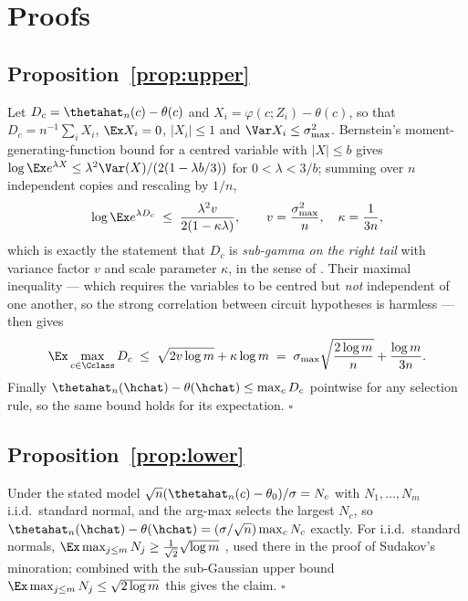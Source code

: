 \section{Proofs}
\label{app:proofs}

\subsection{Proposition~\ref{prop:upper}}

Let $D_c=\thetahat_n(c)-\theta(c)$ and $X_i = \varphi(c;Z_i)-\theta(c)$, so that
$D_c=n^{-1}\sum_i X_i$, $\Ex X_i =0$, $|X_i|\le 1$ and $\Var X_i\le\sigma^2_{\max}$.
Bernstein's moment-generating-function bound for a centred variable with
$|X|\le b$ gives $\log\Ex e^{\lambda X}\le\lambda^2\Var(X)/(2(1-\lambda b/3))$ for
$0<\lambda<3/b$; summing over $n$ independent copies and rescaling by $1/n$,
\[
\log\Ex e^{\lambda D_c}\;\le\;\frac{\lambda^2 v}{2(1-\kappa\lambda)},
\qquad v=\frac{\sigma^2_{\max}}{n},\quad \kappa=\frac{1}{3n},
\]
which is exactly the statement that $D_c$ is \emph{sub-gamma on the right tail}
with variance factor $v$ and scale parameter $\kappa$, in the sense of
\citet[\S2.4]{boucheron2013concentration}. Their maximal inequality
\citep[Cor.~2.6, p.~33]{boucheron2013concentration} --- which requires the
variables to be centred but \emph{not} independent of one another, so the strong
correlation between circuit hypotheses is harmless --- then gives
\[
\Ex\max_{c\in\Cclass} D_c \;\le\; \sqrt{2v\log m} + \kappa\log m
\;=\; \sigma_{\max}\sqrt{\frac{2\log m}{n}} + \frac{\log m}{3n}.
\]
Finally $\thetahat_n(\hchat)-\theta(\hchat)\le\max_c D_c$ pointwise for any
selection rule, so the same bound holds for its expectation. \hfill$\square$

\subsection{Proposition~\ref{prop:lower}}

Under the stated model $\sqrt n(\thetahat_n(c)-\theta_0)/\sigma = N_c$ with
$N_1,\dots,N_m$ i.i.d.\ standard normal, and the arg-max selects the largest
$N_c$, so $\thetahat_n(\hchat)-\theta(\hchat)=(\sigma/\sqrt n)\max_c N_c$
exactly. For i.i.d.\ standard normals,
$\Ex\max_{j\le m}N_j\ge \tfrac{1}{\sqrt2}\sqrt{\log m}$
\citep[Exercise~13.6]{boucheron2013concentration}, used there in the proof of
Sudakov's minoration; combined with the sub-Gaussian upper bound
$\Ex\max_{j\le m}N_j\le\sqrt{2\log m}$ this gives the claim. \hfill$\square$

